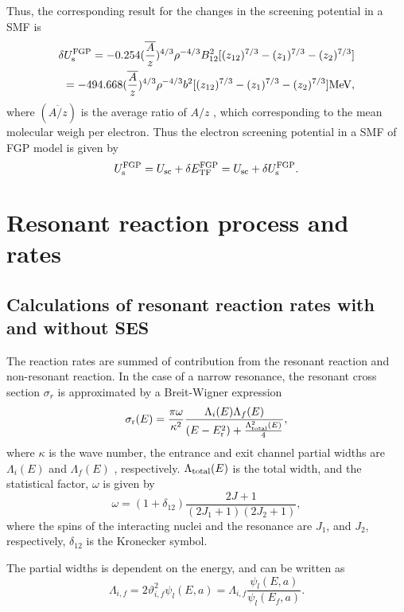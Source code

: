 \documentclass[manuscript]{aastex}
\begin{document}
Thus, the corresponding result for the changes in the screening
potential in a SMF is
\begin{eqnarray}
 \delta U_{\rm{s}}^{\rm{FGP}}=-0.254(\overline{\frac{A}{z}})^{4/3}\rho^{-4/3}B_{12}^2 [(z_{12})^{7/3}-(z_{1})^{7/3}-(z_{2})^{7/3}] \nonumber \\
 =-494.668(\overline{\frac{A}{z}})^{4/3}\rho^{-4/3}b^2[(z_{12})^{7/3}-(z_{1})^{7/3}-(z_{2})^{7/3}]\rm{MeV},
\label{33}
\end{eqnarray}
where $(\overline{A/z})$ is the average ratio of $A/z$ , which
corresponding to the mean molecular weigh per electron. Thus the
electron screening potential in a SMF of FGP model is given by
\begin{equation}
U_{\rm{s}}^{\rm{FGP}}=U_{\rm{sc}}+\delta E_{\rm{TF}}^{\rm{FGP}}
=U_{\rm{sc}}+\delta U_{\rm{s}}^{\rm{FGP}}. \label{34}
\end{equation}


\section{Resonant reaction process and rates}
 \subsection{Calculations of resonant reaction rates with and without SES}
The reaction rates are summed of contribution from the resonant
reaction and non-resonant reaction. In the case of a narrow
resonance, the resonant cross section $\sigma_r$ is approximated by
a Breit-Wigner expression \citep{Fowler67}
\begin{equation}
 \sigma_{\rm{r}}(E)=\frac{\pi\omega}{\kappa^2}\frac{\Lambda_{i}(E)\Lambda_{f}(E)}{(E-E_{\rm{r}}^2)+\frac{\Lambda^2_{\rm{total}}(E)}{4}},
\label{35}
\end{equation}
where $\kappa$ is the wave number, the entrance and exit channel
partial widths are $\Lambda_{i}(E)$ and $\Lambda_f(E)$ ,
respectively. $\Lambda_{\rm{total}}(E)$ is the total width, and the
statistical factor, $\omega$ is given by
\begin{equation}
 \omega=(1+\delta_{12})\frac{2J+1}{(2J_1+1)(2J_2+1)},
\label{36}
\end{equation}
where the spins of the interacting nuclei and the resonance are
$J_1$, and $J_2$, respectively, $\delta_{12}$ is the Kronecker
symbol.

The partial widths is dependent on the energy, and can be written
as\citep{Lane58}
\begin{equation}
 \Lambda_{i, f}=2\vartheta_{i,f}^2\psi_{l}(E,a)=\Lambda_{i,f}\frac{\psi_{l}(E,a)}{\psi_{l}(E_{f},a)}.
\label{37}
\end{equation}
\end{document}
